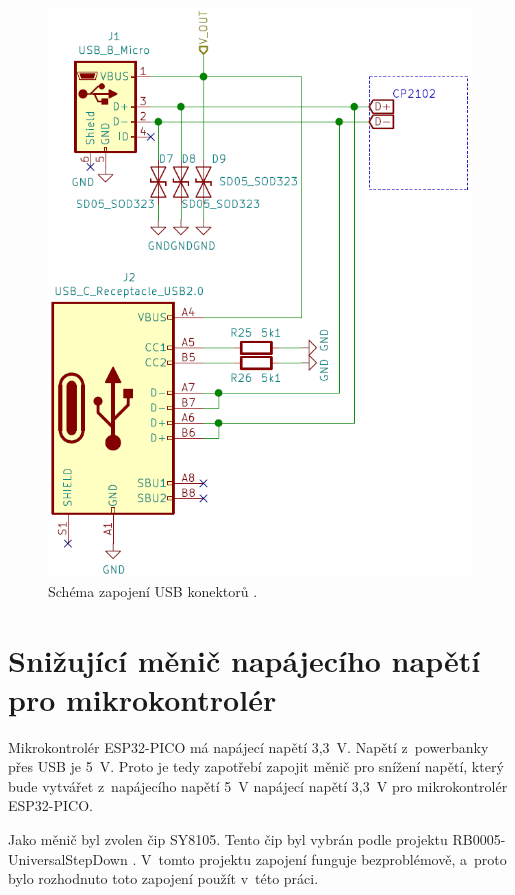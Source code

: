  \begin{figure}[!h]
    \begin{center}
      \includegraphics[scale=0.5]{obrazky/Obe_USB_schema.png}
    \end{center}
    \caption[Schéma zapojení USB konektorů \cite{USB-C}]{Schéma zapojení USB konektorů \cite{USB-C}.}
  \end{figure}

  \section{Snižující měnič napájecího napětí pro mikrokontrolér}
  Mikrokontrolér ESP32-PICO má napájecí napětí 3,3~V. Napětí z~powerbanky přes USB je 5~V. Proto je tedy zapotřebí zapojit 
  měnič pro snížení napětí, který bude vytvářet z~napájecího napětí 5~V napájecí napětí 3,3~V pro mikrokontrolér ESP32-PICO.

  Jako měnič byl zvolen čip SY8105. Tento čip byl vybrán podle projektu RB0005-UniversalStepDown \cite{UniversalStepDown}. 
  V~tomto projektu zapojení funguje bezproblémově, a~proto bylo rozhodnuto toto zapojení použít v~této práci. 

